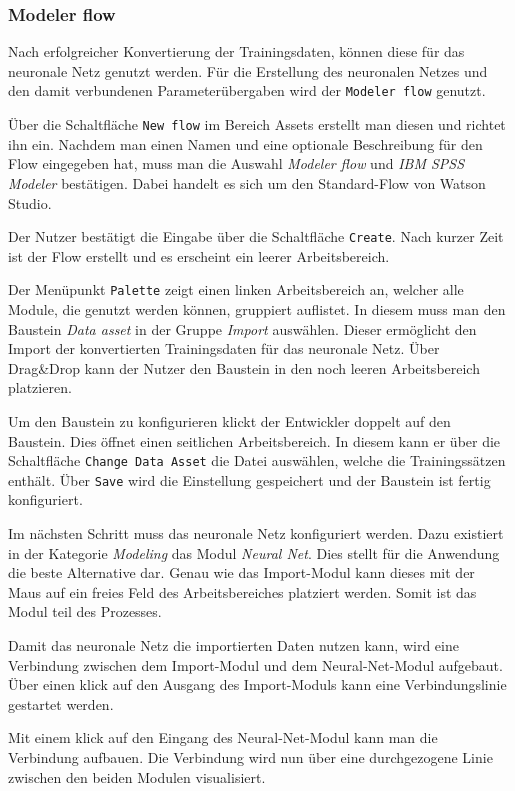 \subsubsection{Modeler flow}
\label{subsub:modeler_flow}
Nach erfolgreicher Konvertierung der Trainingsdaten, können diese für das neuronale Netz genutzt werden. Für die
Erstellung des neuronalen Netzes und den damit verbundenen Parameterübergaben wird der \texttt{Modeler flow} genutzt.

Über die Schaltfläche \texttt{New flow} im Bereich Assets erstellt man diesen und richtet ihn ein. Nachdem man einen Namen
und eine optionale Beschreibung für den Flow eingegeben hat, muss man die Auswahl \textit{Modeler flow} und
\textit{IBM SPSS Modeler} bestätigen. Dabei handelt es sich um den Standard-Flow von Watson Studio.

Der Nutzer bestätigt die Eingabe über die Schaltfläche \texttt{Create}. Nach kurzer Zeit ist der Flow erstellt und es
erscheint ein leerer Arbeitsbereich.

Der Menüpunkt \texttt{Palette} zeigt einen linken Arbeitsbereich an, welcher alle Module, die genutzt werden können,
gruppiert auflistet. In diesem muss man den Baustein \textit{Data asset} in der Gruppe \textit{Import} auswählen. Dieser
ermöglicht den Import der konvertierten Trainingsdaten für das neuronale Netz. Über Drag\&Drop kann der Nutzer den
Baustein in den noch leeren Arbeitsbereich platzieren.

Um den Baustein zu konfigurieren klickt der Entwickler doppelt auf den Baustein. Dies öffnet einen seitlichen
Arbeitsbereich. In diesem kann er über die Schaltfläche \texttt{Change Data Asset} die Datei auswählen, welche die
Trainingssätzen enthält. Über \texttt{Save} wird die Einstellung gespeichert und der Baustein ist fertig konfiguriert.

Im nächsten Schritt muss das neuronale Netz konfiguriert werden. Dazu existiert in der Kategorie \textit{Modeling} das
Modul \textit{Neural Net}. Dies stellt für die Anwendung die beste Alternative dar. Genau wie das Import-Modul kann dieses
mit der Maus auf ein freies Feld des Arbeitsbereiches platziert werden. Somit ist das Modul teil des Prozesses.

Damit das neuronale Netz die importierten Daten nutzen kann, wird eine Verbindung zwischen dem Import-Modul und dem
Neural-Net-Modul aufgebaut. Über einen klick auf den Ausgang des Import-Moduls kann eine Verbindungslinie gestartet werden.

Mit einem klick auf den Eingang des Neural-Net-Modul kann man die Verbindung aufbauen. Die Verbindung wird nun über eine
durchgezogene Linie zwischen den beiden Modulen visualisiert.

